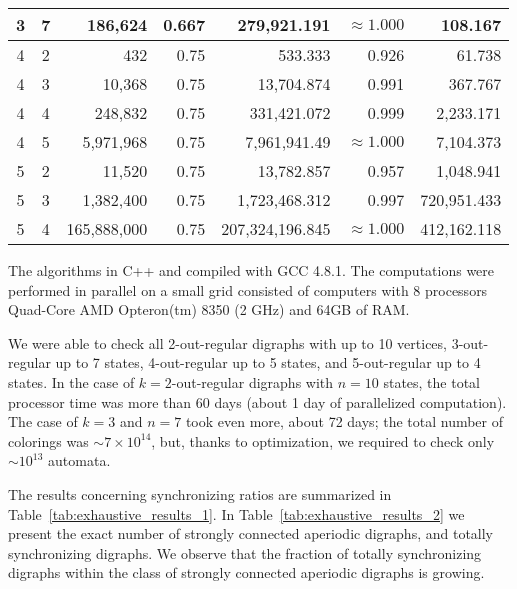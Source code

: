 \documentclass[runningheads]{llncs}
\begin{document}
\begin{table}
\begin{center}
\begin{tabular}{|c|c|r|r|r|r|r|}
  3 & 7  & 186,624    & 0.667     & 279,921.191     & $\approx 1.000$ & 108.167  \\ \hline 
  4 & 2  & 432        & 0.75      & 533.333         & 0.926           & 61.738  \\ \hline  
  4 & 3  & 10,368     & 0.75      & 13,704.874      & 0.991           & 367.767  \\ \hline
  4 & 4  & 248,832    & 0.75      & 331,421.072     & 0.999           & 2,233.171  \\ \hline
  4 & 5  & 5,971,968  & 0.75      & 7,961,941.49    & $\approx 1.000$ & 7,104.373  \\ \hline
  5 & 2  & 11,520     & 0.75      & 13,782.857      & 0.957           & 1,048.941  \\ \hline  
  5 & 3  & 1,382,400  & 0.75      & 1,723,468.312   & 0.997           & 720,951.433  \\ \hline
  5 & 4  & 165,888,000& 0.75      & 207,324,196.845 & $\approx 1.000$ & 412,162.118  \\ \hline
\end{tabular}
\end{center}
\end{table}

The algorithms in C++ and compiled with GCC 4.8.1.
The computations were performed in parallel on a small grid consisted of computers with 8 processors Quad-Core AMD Opteron(tm) 8350 (2 GHz) and 64GB of RAM.

We were able to check all 2-out-regular digraphs with up to 10 vertices, 3-out-regular up to 7 states, 4-out-regular up to 5 states, and 5-out-regular up to 4 states.
In the case of $k=2$-out-regular digraphs with $n=10$ states, the total processor time was more than 60 days (about 1 day of parallelized computation).
The case of $k=3$ and $n=7$ took even more, about 72 days; the total number of colorings was $\sim 7 \times 10^{14}$, but, thanks to optimization, we required to check only $\sim 10^{13}$ automata.

The results concerning synchronizing ratios are summarized in Table~\ref{tab:exhaustive_results_1}.
In Table~\ref{tab:exhaustive_results_2} we present the exact number of strongly connected aperiodic digraphs, and totally synchronizing digraphs.
We observe that the fraction of totally synchronizing digraphs within the class of strongly connected aperiodic digraphs is growing.
\end{document}
